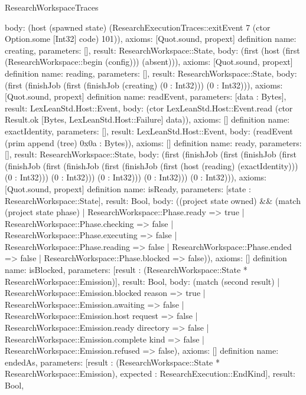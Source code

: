 \begin{lexlean}{ResearchWorkspaceTraces}
\begin{semanticmodule}
{ body: (host (spawned state) (ResearchExecutionTraces::exitEvent 7 (ctor Option.some [Int32] code) 101)),
 axioms: [Quot.sound, propext]
}
definition{
 name: creating,
 parameters: [],
 result: ResearchWorkspace::State,
 body: (first (host (first (ResearchWorkspace::begin (config))) (absent))),
 axioms: [Quot.sound, propext]
}
definition{
 name: reading,
 parameters: [],
 result: ResearchWorkspace::State,
 body: (first (finishJob (first (finishJob (creating) (0 : Int32))) (0 : Int32))),
 axioms: [Quot.sound, propext]
}
definition{
 name: readEvent,
 parameters: [data : Bytes],
 result: LexLeanStd.Host::Event,
 body: (ctor LexLeanStd.Host::Event.read (ctor Result.ok [Bytes, LexLeanStd.Host::Failure] data)),
 axioms: []
}
definition{
 name: exactIdentity,
 parameters: [],
 result: LexLeanStd.Host::Event,
 body: (readEvent (prim append (tree) 0x0a : Bytes)),
 axioms: []
}
definition{
 name: ready,
 parameters: [],
 result: ResearchWorkspace::State,
 body: (first (finishJob (first (finishJob (first (finishJob (first (finishJob (first (finishJob (first (host (reading) (exactIdentity))) (0 : Int32))) (0 : Int32))) (0 : Int32))) (0 : Int32))) (0 : Int32))),
 axioms: [Quot.sound, propext]
}
definition{
 name: isReady,
 parameters: [state : ResearchWorkspace::State],
 result: Bool,
 body: ((project state owned) && (match (project state phase) | ResearchWorkspace::Phase.ready => true | ResearchWorkspace::Phase.checking => false | ResearchWorkspace::Phase.executing => false | ResearchWorkspace::Phase.reading => false | ResearchWorkspace::Phase.ended => false | ResearchWorkspace::Phase.blocked => false)),
 axioms: []
}
definition{
 name: isBlocked,
 parameters: [result : (ResearchWorkspace::State * ResearchWorkspace::Emission)],
 result: Bool,
 body: (match (second result) | ResearchWorkspace::Emission.blocked reason => true | ResearchWorkspace::Emission.awaiting => false | ResearchWorkspace::Emission.host request => false | ResearchWorkspace::Emission.ready directory => false | ResearchWorkspace::Emission.complete kind => false | ResearchWorkspace::Emission.refused => false),
 axioms: []
}
definition{
 name: endedAs,
 parameters: [result : (ResearchWorkspace::State * ResearchWorkspace::Emission), expected : ResearchExecution::EndKind],
 result: Bool,
}
\end{semanticmodule}
\end{lexlean}
